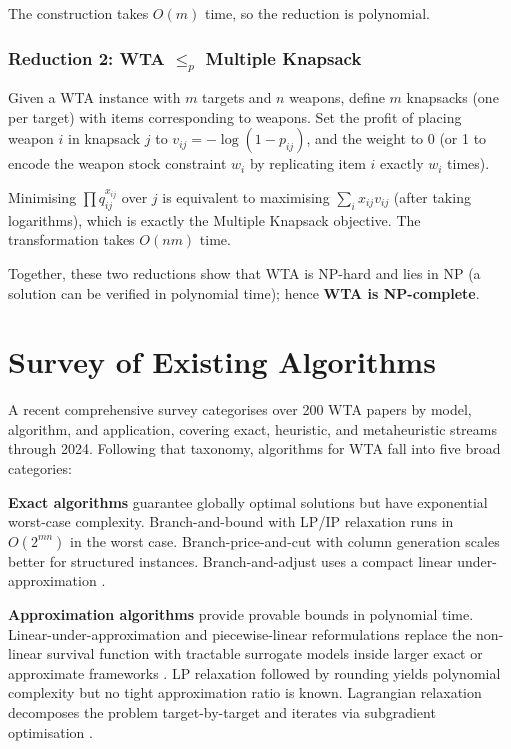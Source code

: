 \documentclass[10pt,conference]{IEEEtran}
\begin{document}
The construction takes $O(m)$ time, so the reduction is polynomial.

\subsubsection{Reduction 2: WTA $\leq_p$ Multiple Knapsack}

Given a WTA instance with $m$ targets and $n$ weapons, define
$m$ knapsacks (one per target) with items corresponding to weapons.
Set the profit of placing weapon $i$ in knapsack $j$ to
$v_{ij} = -\log(1 - p_{ij})$, and the weight to 0 (or 1 to encode the weapon
stock constraint $w_i$ by replicating item $i$ exactly $w_i$ times).

Minimising $\prod q_{ij}^{x_{ij}}$ over $j$ is equivalent to maximising
$\sum_i x_{ij} v_{ij}$ (after taking logarithms), which is exactly the
Multiple Knapsack objective.  The transformation takes $O(nm)$ time.

Together, these two reductions show that WTA is NP-hard and lies in NP
(a solution can be verified in polynomial time); hence \textbf{WTA is NP-complete}.
\fi

\section{Survey of Existing Algorithms}
\label{sec:survey}

A recent comprehensive survey \cite{lu2024} categorises over 200 WTA papers
by model, algorithm, and application, covering exact, heuristic, and
metaheuristic streams through 2024.
Following that taxonomy, algorithms for WTA fall into five broad categories:

\textbf{Exact algorithms} guarantee globally optimal solutions but have
exponential worst-case complexity.  Branch-and-bound with LP/IP relaxation
\cite{ahuja2007} runs in $O(2^{mn})$ in the worst case.  Branch-price-and-cut
with column generation \cite{bertsimas2025} scales better for structured
instances.  Branch-and-adjust uses a compact linear under-approximation
\cite{andersen2022}.

\textbf{Approximation algorithms} provide provable bounds in polynomial time.
Linear-under-approximation and piecewise-linear reformulations replace the
non-linear survival function with tractable surrogate models inside larger exact
or approximate frameworks \cite{andersen2022}.  LP relaxation followed by
rounding yields polynomial complexity but no tight approximation ratio is known.
Lagrangian relaxation decomposes the problem target-by-target and iterates via
subgradient optimisation \cite{kwon1999,kim2022}.
\end{document}
